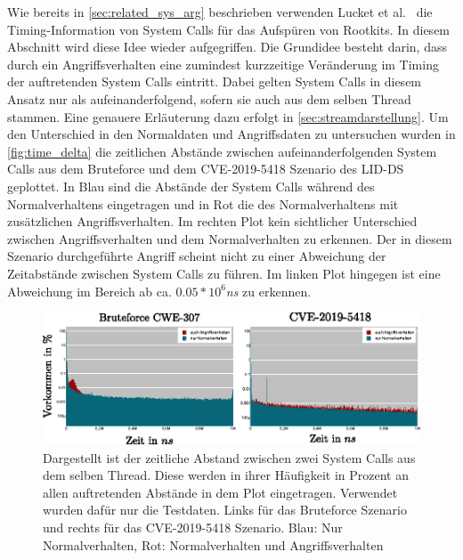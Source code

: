                     Wie bereits in \autoref{sec:related_sys_arg} beschrieben verwenden Lucket et al.~\cite{TIMINGLUCKETT2016} die Timing-Information von System Calls für das Aufspüren von Rootkits.
                    In diesem Abschnitt wird diese Idee wieder aufgegriffen.
                    Die Grundidee besteht darin, dass durch ein Angriffsverhalten eine zumindest kurzzeitige Veränderung im Timing der auftretenden System Calls eintritt.
                    Dabei gelten System Calls in diesem Ansatz nur als aufeinanderfolgend, sofern sie auch aus dem selben Thread stammen.
                    Eine genauere Erläuterung dazu erfolgt in \autoref{sec:streamdarstellung}.
                    Um den Unterschied in den Normaldaten und Angriffsdaten zu untersuchen wurden in \autoref{fig:time_delta} die zeitlichen Abstände zwischen aufeinanderfolgenden System Calls aus dem Bruteforce und dem CVE-2019-5418 Szenario des \ac{LID-DS} geplottet.
                    In Blau sind die Abstände der System Calls während des Normalverhaltens eingetragen und in Rot die des Normalverhaltens mit zusätzlichen Angriffsverhalten.
                    Im rechten Plot kein sichtlicher Unterschied zwischen Angriffsverhalten und dem Normalverhalten zu erkennen.
                    Der in diesem Szenario durchgeführte Angriff scheint nicht zu einer Abweichung der Zeitabstände zwischen System Calls zu führen.
                    Im linken Plot hingegen ist eine Abweichung im Bereich ab ca. $0.05*10^{6}$\textit{ns} zu erkennen.

                    \begin{figure}
                        \centering
                        \includegraphics[width=\textwidth]{images/CVE-2012--Test-data-time_delta.eps}
                        \caption{Dargestellt ist der zeitliche Abstand zwischen zwei System Calls aus dem selben Thread.
                                 Diese werden in ihrer Häufigkeit in Prozent an allen auftretenden Abstände in dem Plot eingetragen.
                                 Verwendet wurden dafür nur die Testdaten. Links für das Bruteforce Szenario und rechts für das CVE-2019-5418 Szenario.
                                 Blau: Nur Normalverhalten, Rot: Normalverhalten und Angriffsverhalten}
                        \label{fig:time_delta}
                    \end{figure}

